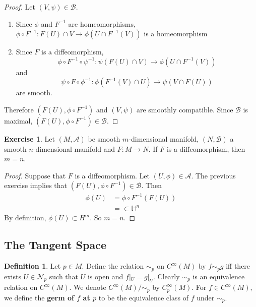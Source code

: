 \documentclass[12pt]{amsart}
\theoremstyle{definition}
\newtheorem{defn}[definition]{Definition}
\theoremstyle{remark}
\theoremstyle{definition}
\newtheorem{ex}[definition]{Exercise}
\renewcommand{\H}{\mathbb{H}}
\newcommand{\MA}{\mathcal{A}}
\newcommand{\MB}{\mathcal{B}}
\newcommand{\MN}{\mathcal{N}}
\begin{document}
	\begin{proof}
		Let $(V, \psi) \in \MB$. 
		\begin{enumerate}
		\item Since $\phi$ and $F^{-1}$ are homeomorphisms, $\phi \circ F^{-1}: F(U) \cap V \rightarrow \phi(U \cap F^{-1}(V))$ is a homeomorphism
		\item Since $F$ is a diffeomorphism, $$\phi \circ F^{-1} \circ \psi^{-1}: \psi(F(U) \cap V) \rightarrow \phi(U \cap F^{-1}(V))$$ and $$\psi \circ F \circ \phi^{-1}: \phi(F^{-1}(V) \cap U) \rightarrow \psi(V \cap F(U))$$ are smooth. 
		\end{enumerate}
		
		Therefore $(F(U), \phi \circ F^{-1})$ and $(V, \psi)$ are smoothly compatible. Since $\MB$ is maximal, $(F(U), \phi \circ F^{-1}) \in \MB$.
	\end{proof}

	\begin{ex}
	Let $(M, \MA)$ be smooth $m$-dimensional manifold, $(N, \MB)$ a smooth $n$-dimensional manifold and $F: M \rightarrow N$. If $F$ is a diffeomorphism, then $m = n$.
	\end{ex}

	\begin{proof}
	Suppose that $F$ is a diffeomorphism. Let $(U, \phi) \in \MA$. The previous exercise implies that $(F(U), \phi \circ F^{-1}) \in \MB$. Then 
	\begin{align*}
	\phi(U)
	&= \phi \circ F^{-1}(F(U)) \\
	&= \subset \H^n
	\end{align*}	 
By definition, $\phi(U) \subset H^m$. So $m = n$.
	\end{proof}








	\newpage
	\subsection{The Tangent Space}

	\begin{defn}
		Let $p \in M$. Define the relation $\sim_p$ on $C^{\infty}(M)$ by $f \sim_p g$ iff there exists $U \in \MN_p$ such that $U$ is open and $f|_U = g|_U$. Clearly $\sim_p$ is an equivalence relation on $C^{\infty}(M)$. We denote $C^{\infty}(M) / \sim_p$ by $C^{\infty}_p(M)$. For $f \in C^{\infty}(M)$, we define the \textbf{germ of $f$ at $p$} to be the equivalence class of $f$ under $\sim_p$. 
	\end{defn}
	
\end{document}
